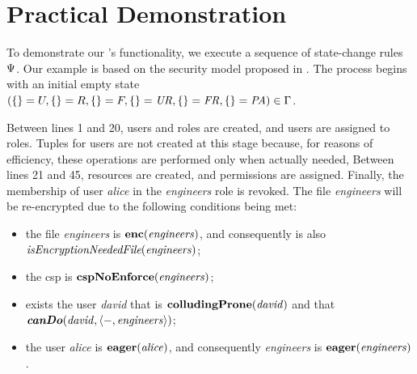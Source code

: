 \section{Practical Demonstration}
\label{sec:implementation.advanced}

To demonstrate our \erbacwhat's functionality, we execute a sequence of state-change rules \( \Psi \). Our example is based on the security model proposed in . The process begins with an initial empty state \( ( \{\} = U, \{\} = R, \{\} = F, \{\} = \mathit{UR}, \{\} = \mathit{FR}, \{\} = \mathit{PA}) \in \Gamma \).

Between lines 1 and 20, users and roles are created, and users are assigned to roles. Tuples for users are not created at this stage because, for reasons of efficiency, these operations are performed only when actually needed, Between lines 21 and 45, resources are created, and permissions are assigned. Finally, the membership of user \textit{alice} in the \textit{engineers} role is revoked. The file \textit{engineers} will be re-encrypted due to the following conditions being met:
\begin{itemize}
	\item the file \textit{engineers} is \( \mathbf{enc}(\mathit{engineers}) \), and consequently is also \( \textit{isEncryptionNeededFile}(\mathit{engineers}) \);
	\item the \gls{csp} is \( \mathbf{cspNoEnforce}(\mathit{engineers}) \);
	\item exists the user \textit{david} that is \( \mathbf{colludingProne}(\mathit{david}) \) and that \( \textbf{\textit{canDo}}(\mathit{david}, \langle -, \allowbreak \mathit{engineers} \rangle) \);
	\item the user \textit{alice} is \( \mathbf{eager}(\mathit{alice}) \), and consequently \textit{engineers} is \( \mathbf{eager}(\mathit{engineers}) \).
\end{itemize}

